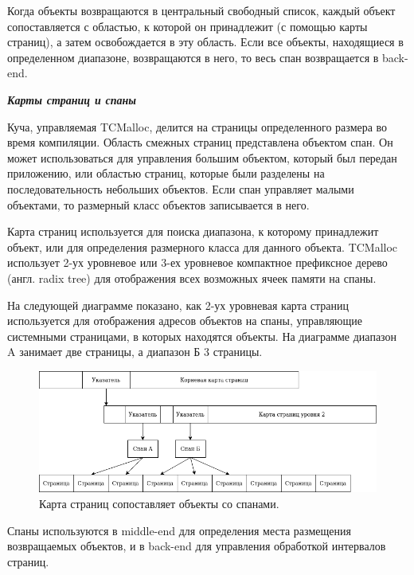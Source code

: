 Когда объекты возвращаются в центральный свободный список, каждый объект сопоставляется с областью, к которой он принадлежит (с помощью карты страниц), а затем освобождается в эту область. Если все объекты, находящиеся в определенном диапазоне, возвращаются в него, то весь спан возвращается в back-end.

\bigbreak
\textit{\textbf{Карты страниц и спаны}}

Куча, управляемая TCMalloc, делится на страницы определенного размера во время компиляции. Область смежных страниц представлена объектом спан. Он может использоваться для управления большим объектом, который был передан приложению, или областью страниц, которые были разделены на последовательность небольших объектов. Если спан управляет малыми объектами, то размерный класс объектов записывается в него.

Карта страниц используется для поиска диапазона, к которому принадлежит объект, или для определения размерного класса для данного объекта. TCMalloc использует 2-ух уровневое или 3-ех уровневое компактное префиксное дерево (англ. radix tree) для отображения всех возможных ячеек памяти на спаны.

На следующей диаграмме показано, как 2-ух уровневая карта страниц используется для отображения адресов объектов на спаны, управляющие системными страницами, в которых находятся объекты. На диаграмме диапазон A занимает две страницы, а диапазон Б 3 страницы.

\begin{figure}[!h]
	\begin{center}
		\includegraphics[scale=0.6]{images/tcmalloc-pagemap-and-spans.png}
		\caption{Карта страниц сопоставляет объекты со спанами.}
		\label{tcmalloc-pagemap-and-spans}
	\end{center}
\end{figure}

Спаны используются в middle-end для определения места размещения возвращаемых объектов, и в back-end для управления обработкой интервалов страниц.

